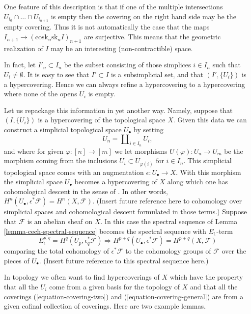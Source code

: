 \begin{remark}
\label{remark-not-covering-set}
One feature of this description is that if one of the multiple
intersections $U_{i_0} \cap \ldots \cap U_{i_{n + 1}}$ is empty then
the covering on the right hand side may be the empty covering.
Thus it is not automatically the case that the maps
$I_{n + 1} \to (\text{cosk}_n\text{sk}_n I)_{n + 1}$ are surjective.
This means that the geometric realization of $I$ may be an interesting
(non-contractible) space.

\medskip\noindent
In fact, let $I'_n \subset I_n$ be the subset
consisting of those simplices $i \in I_n$ such that
$U_i \not = \emptyset$. It is easy to see that $I' \subset I$
is a subsimplicial set, and that $(I', \{U_i\})$ is a hypercovering.
Hence we can always refine a hypercovering to a hypercovering where
none of the opens $U_i$ is empty.
\end{remark}

\begin{remark}
\label{remark-repackage-into-simplicial-space}
Let us repackage this information in yet another way.
Namely, suppose that $(I, \{U_i\})$ is a hypercovering of
the topological space $X$. Given this data we can construct
a simplicial topological space $U_\bullet$ by setting
$$
U_n = \coprod\nolimits_{i \in I_n} U_i,
$$
and where for given $\varphi : [n] \to [m]$ we let
morphisms $U(\varphi) : U_n \to U_m$ be the morphism
coming from the inclusions $U_i \subset U_{\varphi(i)}$
for $i \in I_n$. This simplicial topological space comes
with an augmentation $\epsilon : U_\bullet \to X$.
With this morphism the simplicial space $U_\bullet$ becomes
a hypercovering of $X$ along which one has cohomological descent
in the sense of \cite[Expos\'e Vbis]{SGA4}.
In other words, $H^n(U_\bullet, \epsilon^*\mathcal{F}) = H^n(X, \mathcal{F})$.
(Insert future reference here to cohomology over simplicial
spaces and cohomological descent formulated in those terms.)
Suppose that $\mathcal{F}$ is an abelian sheaf on $X$.
In this case the spectral sequence of Lemma \ref{lemma-cech-spectral-sequence}
becomes the spectral sequence with $E_1$-term
$$
E_1^{p, q} = H^q(U_p, \epsilon_q^*\mathcal{F})
\Rightarrow
H^{p + q}(U_\bullet, \epsilon^*\mathcal{F}) = H^{p + q}(X, \mathcal{F})
$$
comparing the total cohomology of $\epsilon^*\mathcal{F}$
to the cohomology groups of $\mathcal{F}$ over the pieces
of $U_\bullet$. (Insert future reference to this spectral sequence
here.)
\end{remark}

\noindent
In topology we often want to find hypercoverings of $X$ which
have the property that all the $U_i$ come from a given basis for the topology
of $X$ and that all the coverings
(\ref{equation-covering-two}) and (\ref{equation-covering-general})
are from a given cofinal collection of coverings.
Here are two example lemmas.

